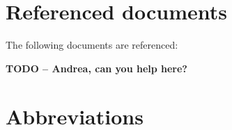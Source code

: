 \documentclass[a4paper, oneside, 11pt, article, english]{memoir}
\begin{document}
\section{Referenced documents}
\label{sec:docs}


The following documents are referenced:

\textbf{TODO -- Andrea, can you help here?}

\begin{description}
  \firmlist
\end{description}


\section{Abbreviations}
\label{sec:abbrev}

\end{document}
